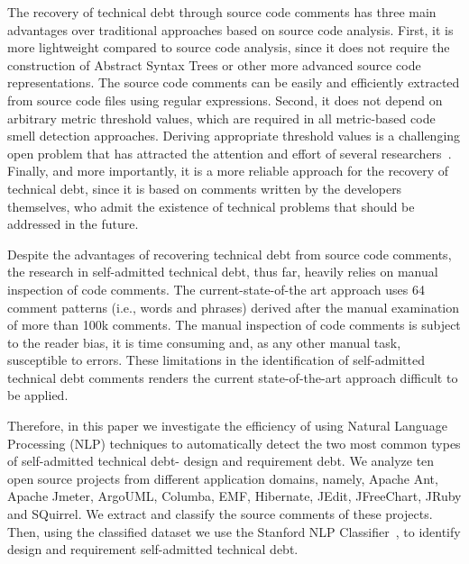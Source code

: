 \documentclass[10pt,journal,compsoc]{IEEEtran}
\newcommand{\emad}[1]{\textcolor{red}{{\it [Emad: #1]}}}
\newcommand{\SATD}{self-admitted technical debt\xspace}
\begin{document}
The recovery of technical debt through source code comments has three main advantages over traditional approaches based on source code analysis. First, it is more lightweight compared to source code analysis, since it does not require the construction of Abstract Syntax Trees or other more advanced source code representations. The source code comments can be easily and efficiently extracted from source code files using regular expressions.
Second, it does not depend on arbitrary metric threshold values, which are required in all metric-based code smell detection approaches.
Deriving appropriate threshold values is a challenging open problem that has attracted the attention and effort of several researchers~\cite{Oliveira:2014,Fontana:2015,Fontana:EMSE:2015}.
Finally, and more importantly, it is a more reliable approach for the recovery of technical debt, since it is based on comments written by the developers themselves, who admit the existence of technical problems that should be addressed in the future.

Despite the advantages of recovering technical debt from source code comments, the research in \SATD, thus far, heavily relies on manual inspection of code comments. The current-state-of-the art approach uses 64 comment patterns (i.e., words and phrases) derived after the manual examination of more than 100k comments. The manual inspection of code comments is subject to the reader bias, it is time consuming and, as any other manual task, susceptible to errors. These limitations in the identification of \SATD comments renders the current state-of-the-art approach difficult to be applied.

Therefore, in this paper we investigate the efficiency of using Natural Language Processing (NLP) techniques to automatically detect the two most common types of \SATD - design and requirement debt. We analyze ten open source projects from different application domains, namely, Apache Ant, Apache Jmeter, ArgoUML, Columba, EMF, Hibernate, JEdit, JFreeChart, JRuby and SQuirrel. We extract and classify the source comments of these projects. Then, using the classified dataset we use the Stanford NLP Classifier~\cite{Manning2014ACL}, to identify design and requirement \SATD.
\end{document}
